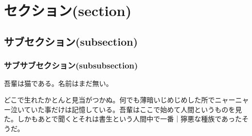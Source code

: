 \hypertarget{ux30bbux30afux30b7ux30e7ux30f3section}{%
\section{セクション(section)}\label{ux30bbux30afux30b7ux30e7ux30f3section}}

\hypertarget{ux30b5ux30d6ux30bbux30afux30b7ux30e7ux30f3subsection}{%
\subsection{サブセクション(subsection)}\label{ux30b5ux30d6ux30bbux30afux30b7ux30e7ux30f3subsection}}

\hypertarget{ux30b5ux30d6ux30b5ux30d6ux30bbux30afux30b7ux30e7ux30f3subsubsection}{%
\subsubsection{サブサブセクション(subsubsection)}\label{ux30b5ux30d6ux30b5ux30d6ux30bbux30afux30b7ux30e7ux30f3subsubsection}}

吾輩は猫である。名前はまだ無い。

どこで生れたかとんと見当がつかぬ。何でも薄暗いじめじめした所でニャーニャー泣いていた事だけは記憶している。吾輩はここで始めて人間というものを見た。しかもあとで聞くとそれは書生という人間中で一番｜獰悪な種族であったそうだ。


